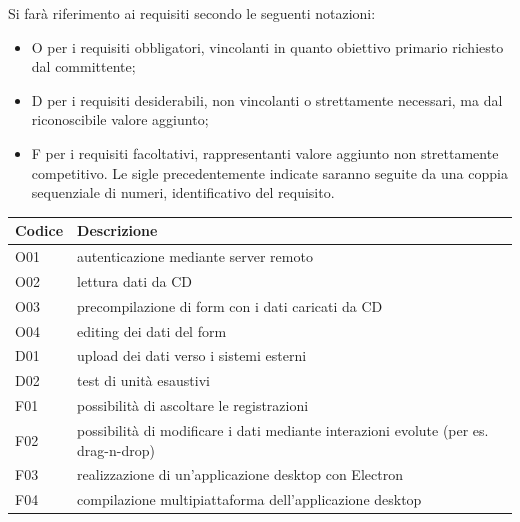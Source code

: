 Si farà riferimento ai requisiti secondo le seguenti notazioni:
\begin{itemize}
  \item O per i requisiti obbligatori, vincolanti in quanto obiettivo primario richiesto dal committente;
  \item D per i requisiti desiderabili, non vincolanti o strettamente necessari, ma dal riconoscibile valore aggiunto;
  \item F per i requisiti facoltativi, rappresentanti valore aggiunto non strettamente competitivo.
        Le sigle precedentemente indicate saranno seguite da una coppia sequenziale di numeri, identificativo del requisito.
\end{itemize}

\begin{center}
  \renewcommand{\arraystretch}{1.8} %
  \begin{tabular}{ |l|l| }
    \hline
    \textbf{Codice} & \textbf{Descrizione}                                                                \\
    \hline
    O01             & autenticazione mediante server remoto                                               \\
    \hline
    O02             & lettura dati da CD                                                                  \\
    \hline
    O03             & precompilazione di form con i dati caricati da CD                                   \\
    \hline
    O04             & editing dei dati del form                                                           \\
    \hline
    D01             & upload dei dati verso i sistemi esterni                                             \\
    \hline
    D02             & test di unità esaustivi                                                             \\
    \hline
    F01             & possibilità di ascoltare le registrazioni                                           \\
    \hline
    F02             & possibilità di modificare i dati mediante interazioni evolute (per es. drag-n-drop) \\
    \hline
    F03             & realizzazione di un'applicazione desktop con Electron                               \\
    \hline
    F04             & compilazione multipiattaforma dell'applicazione desktop                             \\
    \hline
  \end{tabular}
\end{center}

